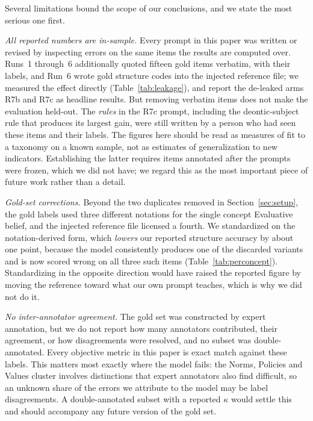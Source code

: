 \documentclass[onecolumn, 11pt]{IEEEtran}
\begin{document}
Several limitations bound the scope of our conclusions, and we state the most serious one first.

\emph{All reported numbers are in-sample.} Every prompt in this paper was written or revised by inspecting errors on the same items the results are computed over. Runs~1 through~6 additionally quoted fifteen gold items verbatim, with their labels, and Run~6 wrote gold structure codes into the injected reference file; we measured the effect directly (Table~\ref{tab:leakage}), and report the de-leaked arms R7b and R7c as headline results. But removing verbatim items does not make the evaluation held-out. The \emph{rules} in the R7c prompt, including the deontic-subject rule that produces its largest gain, were still written by a person who had seen these items and their labels. The figures here should be read as measures of fit to a taxonomy on a known sample, not as estimates of generalization to new indicators. Establishing the latter requires items annotated after the prompts were frozen, which we did not have; we regard this as the most important piece of future work rather than a detail.

\emph{Gold-set corrections.} Beyond the two duplicates removed in Section~\ref{sec:setup}, the gold labels used three different notations for the single concept Evaluative belief, and the injected reference file licensed a fourth. We standardized on the notation-derived form, which \emph{lowers} our reported structure accuracy by about one point, because the model consistently produces one of the discarded variants and is now scored wrong on all three such items (Table~\ref{tab:perconcept}). Standardizing in the opposite direction would have raised the reported figure by moving the reference toward what our own prompt teaches, which is why we did not do it.

\emph{No inter-annotator agreement.} The gold set was constructed by expert annotation, but we do not report how many annotators contributed, their agreement, or how disagreements were resolved, and no subset was double-annotated. Every objective metric in this paper is exact match against these labels. This matters most exactly where the model fails: the Norms, Policies and Values cluster involves distinctions that expert annotators also find difficult, so an unknown share of the errors we attribute to the model may be label disagreements. A double-annotated subset with a reported $\kappa$ would settle this and should accompany any future version of the gold set.
\end{document}
